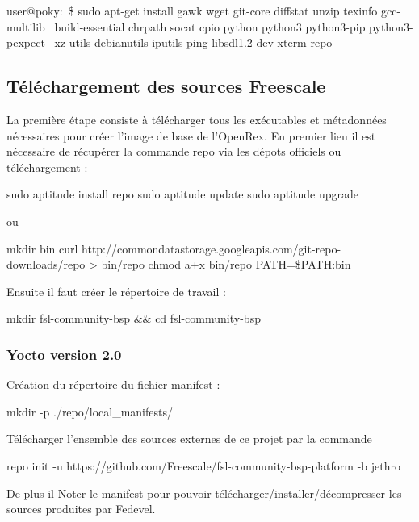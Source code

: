 	\begin{tcolorbox}
		user@poky:~\$ sudo apt-get install gawk wget git-core diffstat unzip texinfo gcc-multilib \
		build-essential chrpath socat cpio python python3 python3-pip python3-pexpect \
		xz-utils debianutils iputils-ping libsdl1.2-dev xterm repo
	\end{tcolorbox}

	\subsection{Téléchargement des sources Freescale}
	La première étape consiste à télécharger tous les exécutables et métadonnées nécessaires pour créer l’image de base de l’OpenRex. En premier lieu il est nécessaire de récupérer la commande repo via les dépots officiels ou téléchargement :

	\begin{tcolorbox}
		sudo aptitude install repo
		sudo aptitude update
		sudo aptitude upgrade
	\end{tcolorbox}

	ou

	\begin{tcolorbox}
		mkdir bin
		curl http://commondatastorage.googleapis.com/git-repo-downloads/repo > bin/repo
		chmod a+x bin/repo
		PATH=\${PATH}:bin
	\end{tcolorbox}

	Ensuite il faut créer le répertoire de travail :

	\begin{tcolorbox}
		mkdir fsl-community-bsp \&\& cd fsl-community-bsp
		\subsubsection{Yocto version 2.0}
		Création du répertoire du fichier manifest :
	\end{tcolorbox}

	\begin{tcolorbox}
		mkdir -p ./repo/local\_manifests/
	\end{tcolorbox}

	Télécharger l’ensemble des sources externes de ce projet par la commande

	\begin{tcolorbox}
		repo init -u https://github.com/Freescale/fsl-community-bsp-platform -b jethro
	\end{tcolorbox}

	De plus il Noter le manifest pour pouvoir télécharger/installer/décompresser les sources produites par Fedevel.

